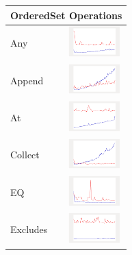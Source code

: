 \begin{longtable}{ m{2.5cm} m{8cm} m{2cm} }
 \multicolumn{3}{c}{{\bf OrderedSet Operations}}\\\hline
 
 Any &
  
  & 
  	\includegraphics[width=2cm]{graphs/orderedset/small/Any}
  \\\hline
  
  Append &
  
  & 
  	\includegraphics[width=2cm]{graphs/orderedset/small/Append}
  \\\hline
  
  At &
  
  & 
  \includegraphics[width=2cm]{graphs/orderedset/small/At}
\\\hline

Collect &

&
\includegraphics[width=2cm]{graphs/orderedset/small/Collect}
\\\hline

EQ &

&
\includegraphics[width=2cm]{graphs/orderedset/small/EQ}
\\\hline

Excludes &

&
\includegraphics[width=2cm]{graphs/orderedset/small/Excludes}
\\\hline


\end{longtable}
